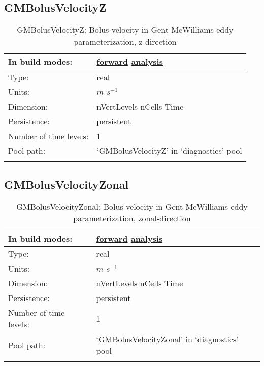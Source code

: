 \subsection[GMBolusVelocityZ]{GMBolusVelocityZ}
\label{subsec:var_sec_diagnostics_GMBolusVelocityZ}
\begin{center}
\begin{longtable}{| p{2.0in} | p{4.0in} |}
        \hline 
        In build modes: & \hyperref[subsec:forward_var_tab_diagnostics]{forward} \hyperref[subsec:analysis_var_tab_diagnostics]{analysis} \\
        \hline 
        Type: & real \\
        \hline 
        Units: & $m$ $s^{-1}$ \\
        \hline 
        Dimension: & nVertLevels nCells Time \\
        \hline 
        Persistence: & persistent \\
        \hline 
        Number of time levels: & 1 \\
        \hline 
            Pool path: & `GMBolusVelocityZ' in `diagnostics' pool \\
		 \hline 
    \caption{GMBolusVelocityZ: Bolus velocity in Gent-McWilliams eddy parameterization, z-direction}
\end{longtable}
\end{center}
\subsection[GMBolusVelocityZonal]{GMBolusVelocityZonal}
\label{subsec:var_sec_diagnostics_GMBolusVelocityZonal}
\begin{center}
\begin{longtable}{| p{2.0in} | p{4.0in} |}
        \hline 
        In build modes: & \hyperref[subsec:forward_var_tab_diagnostics]{forward} \hyperref[subsec:analysis_var_tab_diagnostics]{analysis} \\
        \hline 
        Type: & real \\
        \hline 
        Units: & $m$ $s^{-1}$ \\
        \hline 
        Dimension: & nVertLevels nCells Time \\
        \hline 
        Persistence: & persistent \\
        \hline 
        Number of time levels: & 1 \\
        \hline 
            Pool path: & `GMBolusVelocityZonal' in `diagnostics' pool \\
		 \hline 
    \caption{GMBolusVelocityZonal: Bolus velocity in Gent-McWilliams eddy parameterization, zonal-direction}
\end{longtable}
\end{center}
